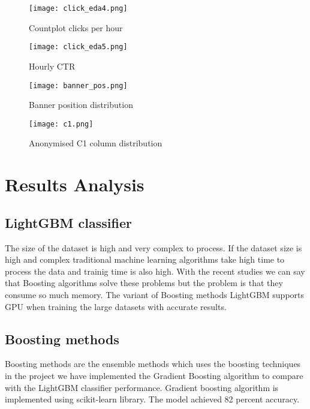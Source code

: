 \documentclass[conference]{IEEEtran}
\begin{document}
 \begin{figure}[!ht]
     \centering
     \texttt{[image: click\_eda4.png]}
    \caption{Countplot clicks per hour}
    \label{fig:8}
 \end{figure}
 
 
 \begin{figure}[!ht]
     \centering
     \texttt{[image: click\_eda5.png]}
    \caption{Hourly CTR}
    \label{fig:8}
 \end{figure}

  \begin{figure}[!ht]
     \centering
     \texttt{[image: banner\_pos.png]}
    \caption{Banner position distribution}
    \label{fig:8}
 \end{figure}
 
 
 \begin{figure}[!ht]
     \centering
     \texttt{[image: c1.png]}
    \caption{Anonymised C1 column distribution}
    \label{fig:8}
 \end{figure}
 
\newpage
\section{Results Analysis}
\subsection{\textbf{LightGBM classifier}}
The size of the dataset is high and very complex to process. If the dataset size is high and complex traditional machine learning algorithms take high time to process the data and trainig time is also high. With the recent studies we can say that Boosting algorithms solve these problems but the problem is that they consume so much memory. The variant of Boosting methods LightGBM supports GPU when training the large datasets with accurate results.

\subsection{\textbf{Boosting methods}}

Boosting methods are the ensemble methods which uses the boosting techniques in the project we have implemented the Gradient Boosting algorithm to compare with the LightGBM classifier performance. Gradient boosting algorithm is implemented using scikit-learn library. The model achieved 82 percent accuracy.
\end{document}
